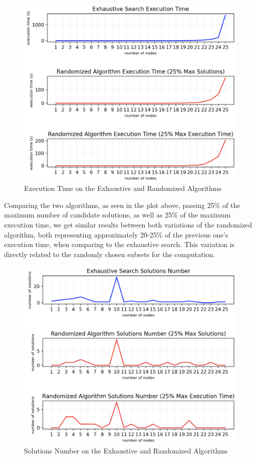 \documentclass[...]{revdetua}
\begin{document}
\begin{figure}[H]
    \centering
    \includegraphics[width=0.9\columnwidth]{./figures/execution_time_0.25.png}
    \caption{Execution Time on the Exhaustive and Randomized Algorithms}
    \label{fig: Execution Time on the Exhaustive and Randomized Algorithms}
\end{figure}

Comparing the two algorithms, as seen in the plot above, passing 25\% of the maximum number of candidate solutions, as well as 25\% of the maximum execution time, we get similar results between both variations of the randomized algorithm, both representing approximately 20-25\% of the previous one's execution time, when comparing to the exhaustive search. This variation is directly related to the randomly chosen subsets for the computation.

\begin{figure}[H]
    \centering
    \includegraphics[width=0.9\columnwidth]{./figures/solutions_number_0.25.png}
    \caption{Solutions Number on the Exhaustive and Randomized Algorithms}
    \label{fig: Solutions Number on the Exhaustive and Randomized Algorithms}
\end{figure}
\end{document}
